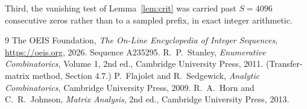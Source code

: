\documentclass[11pt,a4paper]{article}
\theoremstyle{plain}
\theoremstyle{definition}
\begin{document}
Third, the vanishing test of Lemma~\ref{lem:crit} was carried past $S=4096$ consecutive
zeros rather than to a sampled prefix, in exact integer arithmetic.

\begin{thebibliography}{9}
 The OEIS Foundation, \emph{The On-Line Encyclopedia of Integer
Sequences}, \url{https://oeis.org}, 2026. Sequence A235295.
 R.~P.~Stanley, \emph{Enumerative Combinatorics}, Volume 1, 2nd ed.,
Cambridge University Press, 2011. (Transfer-matrix method, Section 4.7.)
 P.~Flajolet and R.~Sedgewick, \emph{Analytic Combinatorics}, Cambridge
University Press, 2009.
 R.~A.~Horn and C.~R.~Johnson, \emph{Matrix Analysis}, 2nd ed., Cambridge
University Press, 2013.
\end{thebibliography}
\end{document}
